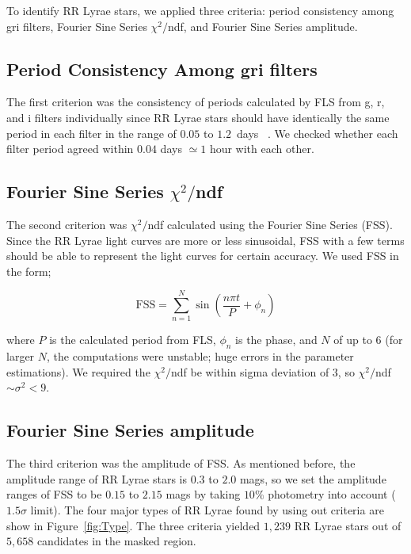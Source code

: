 \documentclass[aps,prb,twocolumn,superscriptaddress]{revtex4-1}
\begin{document}
To identify RR Lyrae stars, we applied three criteria: period consistency among gri filters, Fourier Sine Series $\chi^2/$ndf, and Fourier Sine Series amplitude. 

\subsection{Period Consistency Among gri filters}
The first criterion was the consistency of periods calculated by FLS from g, r, and i filters individually since RR Lyrae stars should have identically the same period in each filter in the range of $0.05$ to $1.2$~days ~\citep{Astro}. We checked whether each filter period agreed within $0.04$ days $\simeq 1$ hour with each other. 

\subsection{Fourier Sine Series $\chi^2/$ndf}
The second criterion was $\chi^2/$ndf calculated using the Fourier Sine Series (FSS). Since the RR Lyrae light curves are more or less sinusoidal, FSS with a few terms should be able to represent the light curves for certain accuracy. We used FSS in the form;

\begin{equation}
\label{FSS}
\text{FSS} = \sum_{n=1}^{N} \sin{\left(\frac{n \pi t}{P} + \phi_n \right)}
\end{equation}

\noindent where $P$ is the calculated period from FLS, $\phi_n$ is the phase, and $N$ of up to $6$ (for larger $N$, the computations were unstable; huge errors in the parameter estimations). We required the $\chi^2/$ndf be within sigma deviation of $3$, so $\chi^2/$ndf $\sim \sigma^2 < 9$. 

\subsection{Fourier Sine Series amplitude}
The third criterion was the amplitude of FSS. As mentioned before, the amplitude range of RR Lyrae stars is $0.3$ to $2.0$ mags, so we set the amplitude ranges of FSS to be $0.15$ to $2.15$ mags by taking $10\%$ photometry into account ($1.5\sigma$ limit). The four major types of RR Lyrae found by using out criteria are show in Figure~\ref{fig:Type}. The three criteria yielded $1,239$ RR Lyrae stars out of $5,658$ candidates in the masked region.
\end{document}
